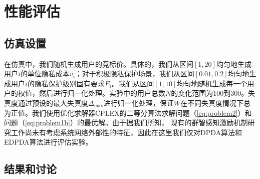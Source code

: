
\section{性能评估}\label{sec:pe}

\subsection{仿真设置}\label{sec:setup}
	在仿真中，我们随机生成用户的竞标价。具体的，我们从区间$[1, 20]$均匀地生成用户$i$的单位隐私成本$v_i$；对于积极隐私保护场景，我们从区间$[0.01, 0.2]$均匀地生成用户$i$的隐私保护级别固有要求$E_i$。我们从区间$[1,10]$均匀地随机生成每一个用户的权值，然后进行归一化处理。实验中的用户总数$N$的变化范围为100到300。失真度通过预设的最大失真度$\Delta_{\max}$进行归一化处理，保证$W$在不同失真度情况下总为正值。我们使用优化求解器CPLEX\cite{CPLEX}的二等分算法求解问题（\ref{eq:problem2}）和问题（\ref{eq:problem1b}）的最优解。由于据我们所知， 现有的群智感知激励机制研究工作尚未有考虑系统网络外部性的特征，因此在这里我们仅对DPDA算法和EDPDA算法进行评估实验。
	
	\vspace{-0.2cm}
	\subsection{结果和讨论}
	

